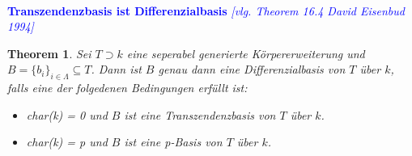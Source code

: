 \documentclass[10pt,a4paper]{report}
\newcommand{\comment}[1]{}
\newcommand{\ModulsOfDifferenzials}{David Eisenbud 1994}
\newcounter{Aussage}[chapter]
\newtheorem{theorem}[Aussage]{Theorem}
\begin{document}
\ \\
\textcolor{blue}{\textbf{Transzendenzbasis ist Differenzialbasis} \textit{[vlg. Theorem 16.4 \ModulsOfDifferenzials]}}
\begin{theorem}\comment{\label{Transzendenzbasis ist Differenzialbasis}}
Sei $T \supset k$ eine seperabel generierte Körpererweiterung und $B = \lbrace b_i \rbrace_{i \in \Lambda} \subseteq T$. Dann ist $B$ genau dann eine Differenzialbasis von $T$ über $k$, falls eine der folgedenen Bedingungen erfüllt ist:
\begin{itemize}
\item[\textbf{1.}] char(k) = 0 und $B$ ist eine Transzendenzbasis von $T$ über $k$.
\item[\textbf{2.}] char(k) = p und $B$ ist eine p-Basis von $T$ über $k$.
\end{itemize}
\end{theorem}
\end{document}
